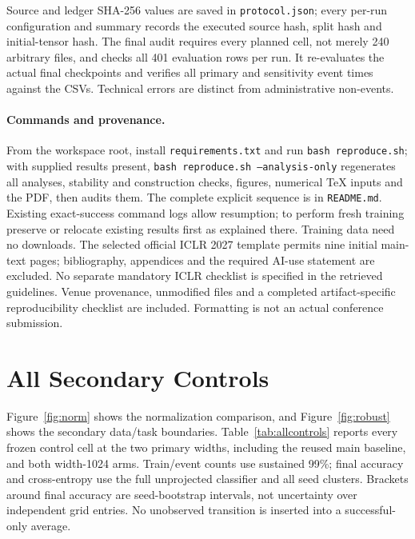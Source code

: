 \documentclass{article}
\begin{document}
Source and ledger SHA-256 values are saved in \texttt{protocol.json}; every per-run configuration and summary records the executed source hash, split hash and initial-tensor hash. The final audit requires every planned cell, not merely 240 arbitrary files, and checks all 401 evaluation rows per run. It re-evaluates the actual final checkpoints and verifies all primary and sensitivity event times against the CSVs. Technical errors are distinct from administrative non-events.

\paragraph{Commands and provenance.}
From the workspace root, install \texttt{requirements.txt} and run \texttt{bash reproduce.sh}; with supplied results present, \texttt{bash reproduce.sh --analysis-only} regenerates all analyses, stability and construction checks, figures, numerical TeX inputs and the PDF, then audits them. The complete explicit sequence is in \texttt{README.md}. Existing exact-success command logs allow resumption; to perform fresh training preserve or relocate existing results first as explained there. Training data need no downloads. The selected official ICLR 2027 template permits nine initial main-text pages; bibliography, appendices and the required AI-use statement are excluded. No separate mandatory ICLR checklist is specified in the retrieved guidelines. Venue provenance, unmodified files and a completed artifact-specific reproducibility checklist are included. Formatting is not an actual conference submission.

\section{All Secondary Controls}\label{app:controls}
Figure~\ref{fig:norm} shows the normalization comparison, and Figure~\ref{fig:robust} shows the secondary data/task boundaries. Table~\ref{tab:allcontrols} reports every frozen control cell at the two primary widths, including the reused main baseline, and both width-1024 arms. Train/event counts use sustained 99\%; final accuracy and cross-entropy use the full unprojected classifier and all seed clusters. Brackets around final accuracy are seed-bootstrap intervals, not uncertainty over independent grid entries. No unobserved transition is inserted into a successful-only average.
\end{document}
